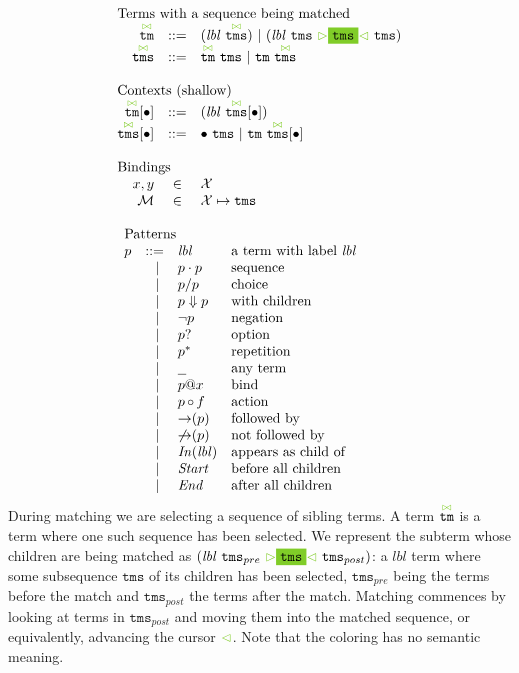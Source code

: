 \documentclass{article}
\makeatletter
\newcommand{\cursorColor}{LimeGreen}
\newcommand{\lbl}{\ensuremath{\mathit{lbl}}}
\newcommand{\tm}{\ensuremath{\mathtt{tm}}}
\newcommand{\tms}{\ensuremath{\mathtt{tms}}}
\newcommand{\Tmc}{\ensuremath{\overset{ \textcolor{\cursorColor}{\bowtie}}{\tm}}}
\newcommand{\Tmcs}{\ensuremath{\overset{\textcolor{\cursorColor}{\bowtie}}{\tms}}}
\newcommand{\mstart}{\ensuremath{\textcolor{\cursorColor}{\rhd}}}
\newcommand{\mend}{\ensuremath{\textcolor{\cursorColor}{\lhd}}}
\newcommand{\bindings}{\ensuremath{\mathcal{M}}}
\newcommand{\select}[1]{\mstart\colorbox{\cursorColor}{$#1$}\mend}
\newcommand{\pseq}[2]{\ensuremath{#1 \cdot #2}}
\newcommand{\por}[2]{\ensuremath{#1/#2}}
\newcommand{\children}[2]{\ensuremath{#1} \Downarrow #2}
\newcommand{\pnot}[1]{\ensuremath{\lnot #1}}
\newcommand{\maybe}[1]{\ensuremath{#1?}}
\newcommand{\many}[1]{\ensuremath{#1^*}}
\newcommand{\any}{\ensuremath{\text{\underline{\hspace{0.6em}}}}}
\newcommand{\bind}[2]{\ensuremath{#1@#2}}
\newcommand{\paction}[2]{\ensuremath{#1\mathop{\circ} #2}}
\newcommand{\fb}[1]{\ensuremath{\mathop{\rightarrow}(#1)}}
\newcommand{\nfb}[1]{\ensuremath{\mathop{\not\rightarrow}(#1)}}
\newcommand{\pin}[1]{\ensuremath{\mathit{In}(#1)}}
\newcommand{\pstart}{\ensuremath{\mathit{Start}}}
\newcommand{\pend}{\ensuremath{\mathit{End}}}
\newcommand{\arrayheading}[2]{\multicolumn{#1}{l}{\mbox{#2}}}
\makeatother
\begin{document}
\[
  \begin{array}{rcl}
    \arrayheading{3}{Terms with a sequence being matched}\\
    \Tmc & ::= & (\lbl~\Tmcs) ~|~ (\lbl~\tms~\select{\tms}~\tms)\\
    \Tmcs & ::= & \Tmc ~ \tms ~|~ \tm ~ \Tmcs\\
    \\
    \arrayheading{3}{Contexts (shallow)}\\
    \Tmc[\bullet] & ::= & (\lbl~\Tmcs[\bullet])\\
    \Tmcs[\bullet] & ::= & \bullet ~ \tms ~|~ \tm ~ \Tmcs[\bullet]\\
    \\
    \arrayheading{3}{Bindings}\\
    x, y      & \in & \mathcal{X}\\
    \bindings & \in & \mathcal{X} \mapsto \tms\\
    \\
    \multicolumn{3}{l}{
    \begin{array}{crll}
      \arrayheading{4}{Patterns}\\
      p & ::= & \lbl & \text{a term with label $\lbl$}\\
        & ~|~ & \pseq{p}{p} & \text{sequence}\\
        & ~|~ & \por{p}{p} & \text{choice}\\
        & ~|~ & \children{p}{p} & \text{with children}\\
        & ~|~ & \pnot{p} & \text{negation}\\
        & ~|~ & \maybe{p} & \text{option}\\
        & ~|~ & \many{p} & \text{repetition}\\
        & ~|~ & \any{} & \text{any term}\\
        & ~|~ & \bind{p}{x} & \text{bind}\\
        & ~|~ & \paction{p}{f} & \text{action}\\
        & ~|~ & \fb{p} & \text{followed by}\\
        & ~|~ & \nfb{p} & \text{not followed by}\\
        & ~|~ & \pin{\lbl} & \text{appears as child of}\\
        & ~|~ & \pstart{} & \text{before all children}\\
        & ~|~ & \pend{} & \text{after all children}\\
    \end{array}
    }\\
  \end{array}
\]
%
During matching we are selecting a sequence of sibling terms. A
term \Tmc{} is a term where one such sequence has been selected.
We represent the subterm whose children are being matched as
$(\lbl~\tms_{pre}~\select{\tms}~\tms_{post})$: a $\lbl$ term
where some subsequence $\tms$ of its children has been selected,
$\tms_{pre}$ being the terms before the match and $\tms_{post}$
the terms after the match. Matching commences by looking at terms
in $\tms_{post}$ and moving them into the matched sequence, or
equivalently, advancing the cursor $\mend$. Note that the coloring
has no semantic meaning.
\end{document}

